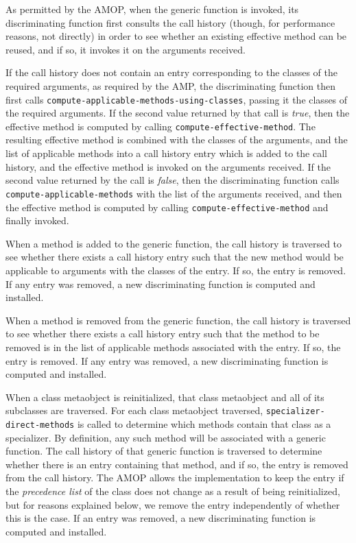As permitted by the AMOP, when the generic function is invoked, its
discriminating function first consults the call history (though, for
performance reasons, not directly) in order to see whether an existing
effective method can be reused, and if so, it invokes it on the
arguments received.

If the call history does not contain an entry corresponding to the
classes of the required arguments, as required by the AMP, the
discriminating function then first calls
\texttt{compute-applicable-methods-using-classes}, passing it the
classes of the required arguments.  If the second value returned by
that call is \textit{true}, then the effective method is computed by
calling \texttt{compute-effective-method}.  The resulting effective
method is combined with the classes of the arguments, and the list of
applicable methods into a call history entry which is added to the
call history, and the effective method is invoked on the arguments
received.  If the second value returned by the call is \textit{false},
then the discriminating function calls
\texttt{compute-applicable-methods} with the list of the arguments
received, and then the effective method is computed by calling
\texttt{compute-effective-method} and finally invoked.

When a method is added to the generic function, the call history is
traversed to see whether there exists a call history entry such that
the new method would be applicable to arguments with the classes of
the entry.  If so, the entry is removed.  If any entry was removed, a
new discriminating function is computed and installed. 

When a method is removed from the generic function, the call history
is traversed to see whether there exists a call history entry such
that the method to be removed is in the list of applicable methods
associated with the entry.  If so, the entry is removed. If any entry
was removed, a new discriminating function is computed and installed.

When a class metaobject is reinitialized, that class metaobject and
all of its subclasses are traversed.  For each class metaobject
traversed, \texttt{specializer-direct-methods} is called to determine
which methods contain that class as a specializer.  By definition, any
such method will be associated with a generic function.  The call
history of that generic function is traversed to determine whether
there is an entry containing that method, and if so, the entry is
removed from the call history.  The AMOP allows the implementation to
keep the entry if the \emph{precedence list} of the class does not
change as a result of being reinitialized, but for reasons explained
below, we remove the entry independently of whether this is the case.
If an entry was removed, a new discriminating function is computed and
installed.

